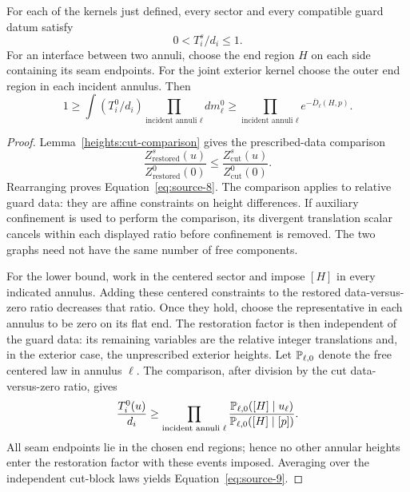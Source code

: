 \begin{lemma}\label{kernels:bounds}
For each of the kernels just defined, every sector and every
compatible guard datum satisfy
\begin{equation}
                  0<T_i^s/d_i\le1. \tag{8}\label{eq:source-8}
\end{equation}
For an interface between two annuli, choose the end region \(H\)
on each side containing its seam endpoints. For the joint exterior
kernel choose the outer end region in each incident annulus. Then
\begin{equation}
 1\ge \int (T_i^0/d_i)
                 \prod_{\text{incident annuli }\ell}dm_\ell^0
 \ge \prod_{\text{incident annuli }\ell}
                    e^{-\overline D_\ell(H,p)} .
 \tag{9}\label{eq:source-9}
\end{equation}
\end{lemma}

\begin{proof}
Lemma~\ref{heights:cut-comparison} gives the prescribed-data comparison
\[
 \frac{Z_{\mathrm{restored}}^s(u)}
      {Z_{\mathrm{restored}}^0(0)}
 \le
 \frac{Z_{\mathrm{cut}}^s(u)}{Z_{\mathrm{cut}}^0(0)}.
\]
Rearranging proves Equation~\eqref{eq:source-8}. The comparison
applies to relative guard data: they are affine constraints on
height differences. If auxiliary confinement is used to perform
the comparison, its divergent translation scalar cancels within
each displayed ratio before confinement is removed. The two graphs
need not have the same number of free components.

For the lower bound, work in the centered sector and impose \([H]\)
in every indicated annulus. Adding these centered constraints to
the restored data-versus-zero ratio decreases that ratio. Once they
hold, choose the representative in each annulus to be zero on
its flat end. The restoration factor is then independent of the
guard data: its remaining variables are the relative integer
translations and, in the exterior case, the unprescribed exterior
heights. Let \(\mathbb P_{\ell,0}\) denote the free centered law in
annulus \(\ell\). The comparison, after division by the cut
data-versus-zero ratio, gives
\[
 \frac{T_i^0(u)}{d_i}
 \ge
 \prod_{\text{incident annuli }\ell}
 \frac{\mathbb P_{\ell,0}([H]\mid u_\ell)}
      {\mathbb P_{\ell,0}([H]\mid[p])}.
\]
All seam endpoints lie in the chosen end regions; hence no other
annular heights enter the restoration factor with these events
imposed. Averaging over the independent cut-block laws yields
Equation~\eqref{eq:source-9}.
\end{proof}

